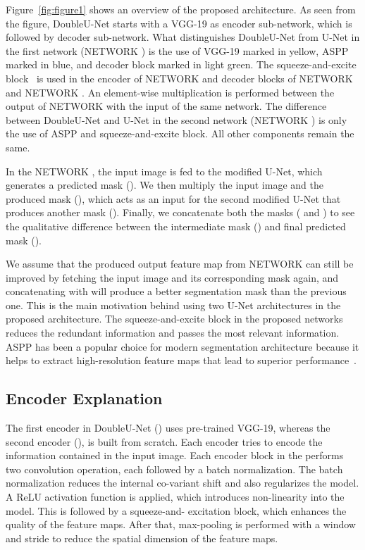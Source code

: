 \documentclass[conference]{IEEEtran}
\begin{document}
Figure~\ref{fig:figure1} shows an overview of the proposed architecture. As seen from the figure, DoubleU-Net starts with a VGG-19 as encoder sub-network, which is followed by decoder sub-network. What distinguishes DoubleU-Net from U-Net in the first network (NETWORK ) is the use of VGG-19 marked in yellow, \ac{ASPP} marked in blue, and decoder block marked in light green. The squeeze-and-excite block~\cite{hu2018squeeze} is used in the encoder of NETWORK  and decoder blocks of NETWORK  and NETWORK . An element-wise multiplication is performed between the output of NETWORK  with the input of the same network. The difference between DoubleU-Net and U-Net in the second network (NETWORK ) is only the use of \ac{ASPP} and squeeze-and-excite block. All other components remain the same. 

In the NETWORK , the input image is fed to the modified U-Net, which generates a predicted mask (). We then multiply the input image and the produced mask (), which acts as an input for the second modified U-Net that produces another mask (). Finally, we concatenate both the masks ( and ) to see the qualitative difference between the intermediate mask ()  and  final predicted mask (). 

We assume that the produced output feature map from NETWORK  can still be improved by fetching the input image and its corresponding mask again, and concatenating with  will produce a better segmentation mask than the previous one. This is the main motivation behind using two U-Net architectures in the proposed architecture. The squeeze-and-excite block in the proposed networks reduces the redundant information and passes the most relevant information. \ac{ASPP} has been a popular choice for modern segmentation architecture because it helps to extract high-resolution feature maps that lead to superior performance~\cite{jha2019resunet++}.

\subsection{Encoder Explanation}
The first encoder in DoubleU-Net () uses pre-trained VGG-19, whereas the second encoder (), is built from scratch. Each encoder tries to encode the information contained in the input image. Each encoder block in the  performs two  convolution operation, each followed by a batch normalization. The batch normalization reduces the internal co-variant shift and also regularizes the model. A \ac{ReLU} activation function is applied, which introduces non-linearity into the model. This is followed by a squeeze-and- excitation block, which enhances the quality of the feature maps. After that, max-pooling is performed with a  window and stride  to reduce the spatial dimension of the feature maps.   
\vspace{-0.2cm}
\end{document}
